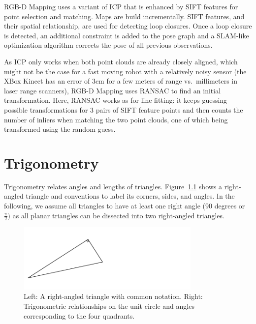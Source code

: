 \documentclass[paper=6.14in:9.21in,pagesize=pdftex,11pt,twoside,openright]{scrbook}
\begin{document}
RGB-D Mapping uses a variant of ICP that is enhanced by SIFT features for point selection and matching. Maps are build incrementally. SIFT features, and their spatial relationship, are used for detecting loop closures. Once a loop closure is detected, an additional constraint is added to the pose graph and a SLAM-like optimization algorithm corrects the pose of all previous observations.

As ICP only works when both point clouds are already closely aligned, which might not be the case for a fast moving robot with a relatively noisy sensor (the XBox Kinect has an error of 3cm for a few meters of range vs.\ millimeters in laser range scanners), RGB-D Mapping uses RANSAC to find an initial transformation. Here, RANSAC works as for line fitting: it keeps guessing possible transformations for 3 pairs of SIFT feature points and then counts the number of inliers when matching the two point clouds, one of which being transformed using the random guess.



\appendix
\chapter{Trigonometry}
Trigonometry relates angles and lengths of triangles. Figure~\ref{fig:triangle} shows a right-angled triangle and conventions to label its corners, sides, and angles. In the following, we assume all triangles to have at least one right angle (90 degrees or $\frac{\pi}{2})$ as all planar triangles can be dissected into two right-angled triangles.

\begin{figure}[!htb]
\centering
\includegraphics[width=0.8\textwidth]{figs/triangle}
\caption{Left: A right-angled triangle with common notation. Right: Trigonometric relationships on the unit circle and angles corresponding to the four quadrants. \label{fig:triangle}}
\end{figure}
\end{document}
